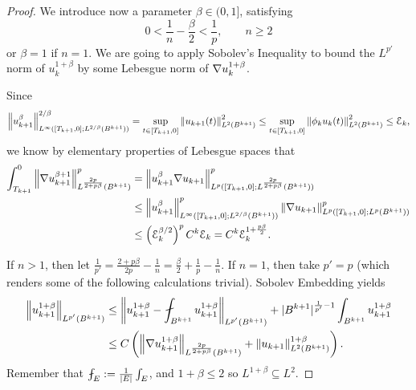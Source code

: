 \begin{proof}
We introduce now a parameter $\beta \in (0,1]$, satisfying
\begin{equation*} 0 < \frac{1}{n} - \frac{\beta}{2} < \frac{1}{p}, \qquad n \geq 2 \end{equation*}
or $\beta=1$ if $n=1$.  We are going to apply Sobolev's Inequality to bound the $L^{p'}$ norm of $u_k^{1+\beta}$ by some Lebesgue norm of $\nabla u_k^{1+\beta}$.  

Since 
\[ \left\lVert u_{k+1}^\beta \right\rVert_{L^\infty([T_{k+1},0];L^{2/\beta}(B^{k+1}))}^{2/\beta} = \sup_{t \in [T_{k+1},0]}  \left\lVert u_{k+1}(t) \right\rVert_{L^2(B^{k+1})}^2 \leq \sup_{t \in [T_{k+1},0]} \left\lVert\phi_k u_k(t)\right\rVert_{L^2(B^{k+1})}^2 \leq \mathcal{E}_k, \]
we know by elementary properties of Lebesgue spaces that
\begin{align} \begin{split} \label{grad_1+beta_bdd}
\int_{T_{k+1}}^0 \left\lVert\nabla u_{k+1}^{\beta+1}\right\rVert_{L^\frac{2p}{2+p\beta}(B^{k+1})}^p &= \left\lVert u_{k+1}^\beta \nabla u_{k+1}\right\rVert_{L^p([T_{k+1},0];L^\frac{2p}{2+p\beta}(B^{k+1}))}^p
\\ &\leq  \left\lVert u_{k+1}^\beta \right\rVert_{L^\infty([T_{k+1},0];L^{2/\beta}(B^{k+1}))}^p \left\lVert\nabla u_{k+1}\right\rVert_{L^p([T_{k+1},0];L^p(B^{k+1}))}^p
\\ &\leq \left( \mathcal{E}_k^{\beta/2} \right)^p C^k \mathcal{E}_k  = C^k \mathcal{E}_k^{1 + \frac{p\beta}{2}}. 
\end{split} \end{align}

If $n > 1$, then let $\frac{1}{p'} = \frac{2+p\beta}{2p} - \frac{1}{n} = \frac{\beta}{2} + \frac{1}{p} - \frac{1}{n}$.  If $n=1$, then take $p' = p$ (which renders some of the following calculations trivial).  
Sobolev Embedding yields
\begin{align*}
\norm{u_{k+1}^{1+\beta}}_{L^{p'}\left(B^{k+1}\right)} &\leq \norm{u_{k+1}^{1+\beta} - \strokedint_{B^{k+1}} u_{k+1}^{1+\beta} }_{L^{p'}\left(B^{k+1}\right)} + |B^{k+1}|^{\frac{1}{p'}-1} \int_{B^{k+1}} u_{k+1}^{1+\beta}
\\ &\leq C \paren{ \norm{\grad u_{k+1}^{1+\beta}}_{L^\frac{2p}{2+p\beta}\left(B^{k+1}\right)} + \norm{u_{k+1}}_{L^2\left(B^{k+1}\right)}^{1+\beta} }.
\end{align*}
Remember that $\strokedint_E := \frac{1}{|E|}\int_E$, and $1+\beta \leq 2$ so $L^{1+\beta} \subseteq L^2$.  


\end{proof}
